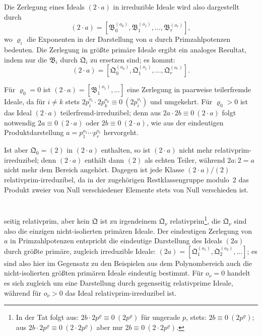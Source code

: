 \documentclass[fontsize=10pt,paper=a5,pagesize,headings=small]{scrbook}
\newcommand{\ideal}[1]{\mathfrak{#1}}
\theoremstyle{plain}
\begin{document}
Die Zerlegung eines Ideals $(2\cdot a)$ in irreduzible Ideale wird also
dargestellt durch
\[ (2\cdot a) = [\ideal{B}_0^{(o_0)}, \ideal{B}_1^{(o_1)},\dots, \ideal{B}_r^{(o_r)}], \]
wo $\varrho_i$ die Exponenten in der Darstellung von $a$ durch Primzahlpotenzen
bedeuten. Die Zerlegung in größte primäre Ideale ergibt ein analoges
Resultat, indem nur die $\ideal{B}_i$ durch $\ideal{Q}_i$ zu ersetzen sind; es kommt:
\[ (2\cdot a) = [\ideal{Q}_0^{(o_0)}, \ideal{Q}_1^{(o_1)},\dots, \ideal{Q}_r^{(o_r)}]. \]

Für $\varrho_0 = 0$ ist $(2\cdot a) = [\ideal{B}_1^{(o_1)},\dots]$ eine Zerlegung in
paarweise teilerfremde Ideale, da für $i \neq k$ stets $2p_i^{o_i} \cdot 2p_k^{o_k}
\equiv 0\ (2p_i^{o_i})$ und umgekehrt. Für $\varrho_0 > 0$ ist das Ideal
$(2\cdot a)$ teilerfremd-irreduzibel; denn aus
$2a \cdot 2b \equiv 0\ (2\cdot a)$ folgt notwendig $2a \equiv 0\ (2\cdot a)$
oder $2b \equiv 0\ (2\cdot a)$, wie aus der eindeutigen Produktdarstellung
$a = p_1^{o_1}\cdots p_r^{o_r}$ hervorgeht.

Ist aber $\ideal{Q}_0 = (2)$ in $(2\cdot a)$ enthalten, so ist $(2\cdot a)$ nicht
mehr relativprim-irreduzibel; denn $(2\cdot a)$ enthält dann $(2)$ als echten
Teiler, während $2a : 2 = a$ nicht mehr dem Bereich angehört. Dagegen
ist jede Klasse $(2\cdot a)/(2)$ relativprim-irreduzibel, da in der zugehörigen
Restklassengruppe modulo~2 das Produkt zweier von Null verschiedener
Elemente stets von Null verschieden ist.

\setcounter{page}{407}
\section*{}

seitig relativprim, aber kein $\ideal{Q}$ ist zu irgendeinem $\ideal{Q}_\nu$ relativprim\footnote{In
der Tat folgt aus: $2b \cdot 2p^\varrho \equiv 0\ (2p^\varrho)$ für ungerade $p$, stets:
$2b \equiv 0\ (2p^\varrho)$; aus $2b \cdot 2p^\varrho \equiv 0\ (2 \cdot 2p^\varrho)$ aber nur
$2b \equiv 0\ (2 \cdot 2p^\varrho)$.}, die $\ideal{Q}_\nu$ sind also die einzigen nicht-isolierten
primären Ideale. Der eindeutigen Zerlegung von $a$ in Primzahlpotenzen
entspricht die eindeutige Darstellung des Ideals $(2a)$ durch größte primäre,
zugleich irreduzible Ideale: $(2a) = [\ideal{Q}_1^{(o_1)}, \ideal{Q}_2^{(o_2)},\dots]$;
es sind also hier im Gegensatz zu den Beispielen aus dem Polynombereich
auch die nicht-isolierten größten primären Ideale eindeutig bestimmt. Für
$o_\nu = 0$ handelt es sich zugleich um eine Darstellung durch gegenseitig
relativprime Ideale, während für $o_\nu > 0$ das Ideal relativprim-irreduzibel
ist.
\end{document}
